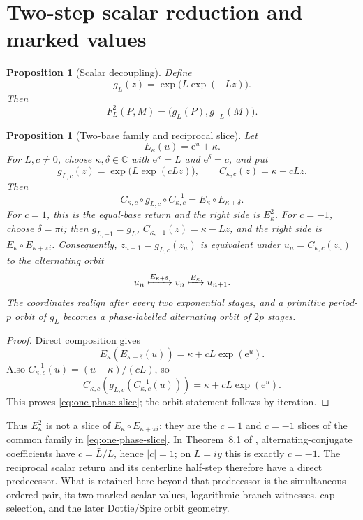\documentclass[11pt]{article}
\newtheorem{proposition}[theorem]{Proposition}
\theoremstyle{definition}
\theoremstyle{remark}
\newcommand{\C}{\mathbb C}
\newcommand{\e}{\mathrm e}
\begin{document}
\section{Two-step scalar reduction and marked values}

\begin{proposition}[Scalar decoupling]\label{prop:decoupling}
Define
\begin{equation}
  g_L(z)=\exp\!\bigl(L\exp(-Lz)\bigr).
  \label{eq:gL}
\end{equation}
Then
\begin{equation}
  F_L^2(P,M)=\bigl(g_L(P),g_{-L}(M)\bigr).
  \label{eq:two-step}
\end{equation}
\end{proposition}

\begin{proposition}[Two-base family and reciprocal slice]\label{prop:one-phase-slice}
Let
\[
  E_\kappa(u)=\e^u+\kappa.
\]
For $L,c\ne0$, choose $\kappa,\delta\in\C$ with $\e^\kappa=L$ and $\e^\delta=c$, and put
\[
  g_{L,c}(z)=\exp\!\bigl(L\exp(cLz)\bigr),
  \qquad
  C_{\kappa,c}(z)=\kappa+cLz.
\]
Then
\begin{equation}
  C_{\kappa,c}\circ g_{L,c}\circ C_{\kappa,c}^{-1}
  =E_\kappa\circ E_{\kappa+\delta}.
  \label{eq:one-phase-slice}
\end{equation}
For $c=1$, this is the equal-base return and the right side is $E_\kappa^2$.  For $c=-1$, choose $\delta=\pi i$; then $g_{L,-1}=g_L$, $C_{\kappa,-1}(z)=\kappa-Lz$, and the right side is $E_\kappa\circ E_{\kappa+\pi i}$.  Consequently, $z_{n+1}=g_{L,c}(z_n)$ is equivalent under $u_n=C_{\kappa,c}(z_n)$ to the alternating orbit
\[
  u_n\xmapsto{E_{\kappa+\delta}}v_n
  \xmapsto{E_\kappa}u_{n+1}.
\]
The coordinates realign after every two exponential stages, and a primitive period-$p$ orbit of $g_L$ becomes a phase-labelled alternating orbit of $2p$ stages.
\end{proposition}

\begin{proof}
Direct composition gives
\[
  E_\kappa\!\left(E_{\kappa+\delta}(u)\right)
  =\kappa+cL\exp(\e^u).
\]
Also $C_{\kappa,c}^{-1}(u)=(u-\kappa)/(cL)$, so
\[
  C_{\kappa,c}\!\left(g_{L,c}(C_{\kappa,c}^{-1}(u))\right)
  =\kappa+cL\exp(\e^u).
\]
This proves \cref{eq:one-phase-slice}; the orbit statement follows by iteration.
\end{proof}

Thus $E_\kappa^2$ is not a slice of $E_\kappa\circ E_{\kappa+\pi i}$: they are the $c=1$ and $c=-1$ slices of the common family in \cref{eq:one-phase-slice}.  In Theorem~8.1 of \citet{BakerRippon1989Composite}, alternating-conjugate coefficients have $c=\bar L/L$, hence $|c|=1$; on $L=iy$ this is exactly $c=-1$.  The reciprocal scalar return and its centerline half-step therefore have a direct predecessor.  What is retained here beyond that predecessor is the simultaneous ordered pair, its two marked scalar values, logarithmic branch witnesses, cap selection, and the later Dottie/Spire orbit geometry.
\end{document}
